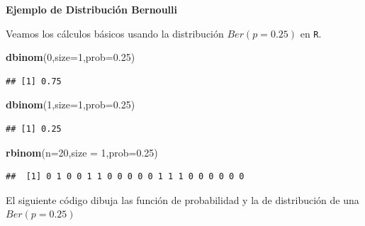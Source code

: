 \documentclass[]{book}
\newenvironment{Shaded}{\begin{snugshade}}{\end{snugshade}}
\newcommand{\DataTypeTok}[1]{\textcolor[rgb]{0.13,0.29,0.53}{#1}}
\newcommand{\DecValTok}[1]{\textcolor[rgb]{0.00,0.00,0.81}{#1}}
\newcommand{\FloatTok}[1]{\textcolor[rgb]{0.00,0.00,0.81}{#1}}
\newcommand{\KeywordTok}[1]{\textcolor[rgb]{0.13,0.29,0.53}{\textbf{#1}}}
\newcommand{\NormalTok}[1]{#1}
\begin{document}
\textbf{Ejemplo de Distribución Bernoulli}

Veamos los cálculos básicos usando la distribución \(Ber(p=0.25)\) en \texttt{R}.

\begin{Shaded}
\begin{Highlighting}[]
\KeywordTok{dbinom}\NormalTok{(}\DecValTok{0}\NormalTok{,}\DataTypeTok{size=}\DecValTok{1}\NormalTok{,}\DataTypeTok{prob=}\FloatTok{0.25}\NormalTok{)}
\end{Highlighting}
\end{Shaded}

\begin{verbatim}
## [1] 0.75
\end{verbatim}

\begin{Shaded}
\begin{Highlighting}[]
\KeywordTok{dbinom}\NormalTok{(}\DecValTok{1}\NormalTok{,}\DataTypeTok{size=}\DecValTok{1}\NormalTok{,}\DataTypeTok{prob=}\FloatTok{0.25}\NormalTok{)}
\end{Highlighting}
\end{Shaded}

\begin{verbatim}
## [1] 0.25
\end{verbatim}

\begin{Shaded}
\begin{Highlighting}[]
\KeywordTok{rbinom}\NormalTok{(}\DataTypeTok{n=}\DecValTok{20}\NormalTok{,}\DataTypeTok{size =} \DecValTok{1}\NormalTok{,}\DataTypeTok{prob=}\FloatTok{0.25}\NormalTok{)}
\end{Highlighting}
\end{Shaded}

\begin{verbatim}
##  [1] 0 1 0 0 1 1 0 0 0 0 0 1 1 1 0 0 0 0 0 0
\end{verbatim}

El siguiente código dibuja las función de probabilidad y la de distribución de una \(Ber(p=0.25)\)
\end{document}
